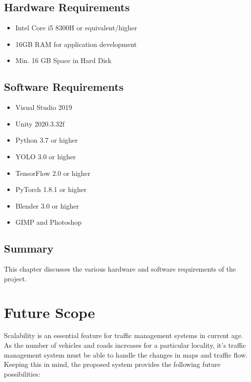 \documentclass[openany,12pt]{report}
\begin{document}
	\newpage
	\section{Hardware Requirements}
	\begin{itemize}
		\item{Intel Core i5 8300H or equivalent/higher}
		\item{16GB RAM for application development}
		\item{Min. 16 GB Space in Hard Disk}
	\end{itemize}
	
	\section{Software Requirements}
	\begin{itemize}
		\item{Visual Studio 2019}
		\item{Unity 2020.3.32f}
		\item{Python 3.7 or higher}
		\item{YOLO 3.0 or higher}
		\item{TensorFlow 2.0 or higher}
		\item{PyTorch 1.8.1 or higher}
		\item{Blender 3.0 or higher}
		\item{GIMP and Photoshop}
	\end{itemize}
	
	\section{Summary}
	\hspace*{0.5in}This chapter discusses the various hardware and software requirements of the project.
	\chapter {Future Scope}
	
	\hspace{0.5in}Scalability is an essential feature for traffic management systems in current age. As the number of vehicles and roads increases for a particular locality, it's traffic management system must be able to handle the changes in maps and traffic flow. Keeping this in mind, the proposed system provides the following future possibilities:\\
	
\end{document}

